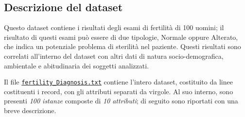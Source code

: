 
\subsection{Descrizione del dataset}\label{subsec:intro:dataset}

Questo dataset contiene i risultati degli esami di fertilità di 100 uomini;
il risultato di questi esami può essere di due tipologie, Normale oppure Alterato, che indica un potenziale problema di sterilità nel paziente.
Questi risultati sono correlati all'interno del dataset con altri dati di natura socio-demografica, ambientale e abitudinaria dei soggetti analizzati.

Il file \href{http://archive.ics.uci.edu/ml/machine-learning-databases/00244/fertility_Diagnosis.txt}{\texttt{fertility\_Diagnosis.txt}}
contiene l'intero dataset, costituito da linee costituenti i record, con gli attributi separati da virgole.
Al suo interno, sono presenti \emph{100 istanze} composte di \emph{10 attributi};
di seguito sono riportati con una breve descrizione.

